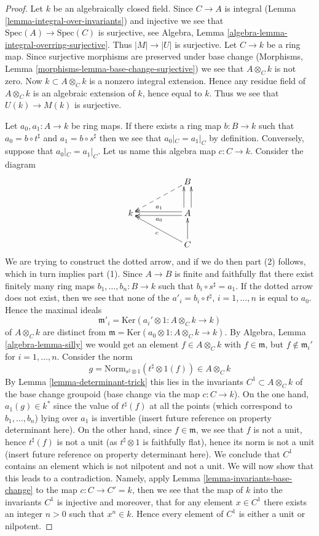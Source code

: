 \begin{proof}
Let $k$ be an algebraically closed field.
Since $C \to A$ is integral (Lemma \ref{lemma-integral-over-invariants})
and injective we see that
$\text{Spec}(A) \to \text{Spec}(C)$ is surjective, see
Algebra, Lemma \ref{algebra-lemma-integral-overring-surjective}.
Thus $|M| \to |U|$ is surjective.
Let $C \to k$ be a ring map. Since surjective morphisms are
preserved under base change
(Morphisms, Lemma \ref{morphisms-lemma-base-change-surjective}) we see that
$A \otimes_C k$ is not zero. Now $k \subset A \otimes_C k$ is a
nonzero integral extension. Hence any residue field of $A \otimes_C k$
is an algebraic extension of $k$, hence equal to $k$. Thus we see that
$U(k) \to M(k)$ is surjective.

\medskip\noindent
Let $a_0, a_1 : A \to k$ be ring maps. If there exists a ring map
$b : B \to k$ such that $a_0 = b \circ t^\sharp$ and $a_1 = b \circ s^\sharp$
then we see that $a_0|_C = a_1|_C$ by definition.
Conversely, suppose that $a_0|_C = a_1|_C$. Let us name this algebra
map $c : C \to k$. Consider the diagram
$$
\xymatrix{
& &
B \ar@{-->}[lld] \\
k & &
A
\ar@<0.5ex>[ll]^{a_0}
\ar@<-0.5ex>[ll]_{a_1}
\ar@<1ex>[u]
\ar@<-1ex>[u] \\
& &
C \ar[u] \ar[llu]^c
}
$$
We are trying to construct the dotted arrow, and if we do then
part (2) follows, which in turn implies part (1).
Since $A \to B$ is finite and faithfully flat
there exist finitely many ring maps
$b_1, \ldots, b_n : B \to k$ such that $b_i \circ s^\sharp = a_1$.
If the dotted arrow does not exist, then we see that none of the
$a'_i = b_i \circ t^\sharp$, $i = 1, \ldots, n$ is equal to $a_0$.
Hence the maximal ideals
$$
\mathfrak m'_i = \text{Ker}(a_i' \otimes 1 : A \otimes_C k \to k)
$$
of $A \otimes_C k$ are distinct from
$\mathfrak m = \text{Ker}(a_0 \otimes 1 : A \otimes_C k \to k)$.
By Algebra, Lemma \ref{algebra-lemma-silly} we would get an element
$f \in A \otimes_C k$ with $f \in \mathfrak m$, but
$f \not \in \mathfrak m_i'$ for $i = 1, \ldots, n$.
Consider the norm
$$
g = \text{Norm}_{s^\sharp \otimes 1}(t^\sharp \otimes 1(f))
\in
A \otimes_C k
$$
By Lemma \ref{lemma-determinant-trick} this lies in the invariants
$C^1 \subset A \otimes_C k$ of the base change
groupoid (base change via the map $c : C \to k$). On the one hand,
$a_1(g) \in k^*$ since
the value of $t^\sharp(f)$ at all the points (which correspond to
$b_1, \ldots, b_n$) lying over $a_1$ is
invertible (insert future reference on property determinant here).
On the other hand, since $f \in \mathfrak m$, we see that
$f$ is not a unit, hence $t^\sharp(f)$ is not a unit
(as $t^\sharp \otimes 1$ is faithfully flat),
hence its norm is not a unit (insert future reference
on property determinant here). We conclude that $C^1$ contains
an element which is not nilpotent
and not a unit. We will now show that this leads to a contradiction.
Namely, apply Lemma \ref{lemma-invariants-base-change}
to the map $c : C \to C' = k$, then
we see that the map of $k$ into the invariants $C^1$ is injective
and moreover, that for any element $x \in C^1$ there exists an integer
$n > 0$ such that $x^n \in k$. Hence every element of $C^1$ is
either a unit or nilpotent.
\end{proof}

